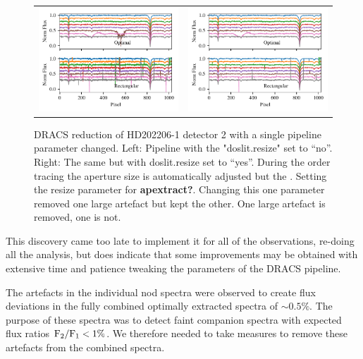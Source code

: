 \begin{figure}
    \centering
    \begin{tabular}{cc}
    \includegraphics[width=0.5\linewidth]{figures/reduction/bp_plots/non_resized_nods_HD202206-1_chip_2} & \includegraphics[width=0.5\linewidth]{figures/reduction/bp_plots/resized_nods_HD202206-1_chip_2}\\
    \end{tabular}
    \caption{DRACS reduction of HD202206-1 detector 2 with a single pipeline parameter changed. Left: Pipeline with the "doslit.resize" set to ``no''. Right: The same but with doslit.resize set to ``yes''. During the order tracing the aperture size is automatically adjusted but the . Setting the resize parameter for \textbf{apextract?}. Changing this one parameter removed one large artefact but kept the other. One large artefact is removed, one is not.}
    \label{fig:resizednods}
\end{figure}

This discovery came too late to implement it for all of the observations, re-doing all the analysis, but does indicate that some improvements may be obtained with extensive time and patience tweaking the parameters of the DRACS pipeline.


The artefacts in the individual nod spectra were observed to create flux deviations in the fully combined optimally extracted spectra of \(\sim 0.5\%\). The purpose of these spectra was to detect faint companion spectra with expected flux ratios \(\rm {F_2}/{F_1} < 1\%\). We therefore needed to take measures to remove these artefacts from the combined spectra.


